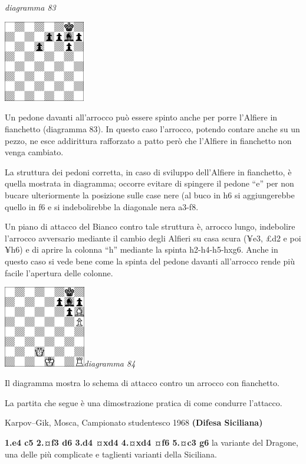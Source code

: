 \documentclass[
]{article}
\begin{document}
\emph{diagramma 83}

\includegraphics[width=1.39792in,height=1.39792in]{vertopal_109f12be458a423d8f3cc838880eaea2/media/image83.png}

Un pedone davanti all'arrocco può essere spinto anche per porre
l'Alfiere in fianchetto (diagramma 83). In questo caso l'arrocco,
potendo contare anche su un pezzo, ne esce addirittura rafforzato a
patto però che l'Alfiere in fianchetto non venga cambiato.

La struttura dei pedoni corretta, in caso di sviluppo dell'Alfiere in
fianchetto, è quella mostrata in diagramma; occorre evitare di spingere
il pedone ``e'' per non bucare ulteriormente la posizione sulle case
nere (al buco in h6 si aggiungerebbe quello in f6 e si indebolirebbe la
diagonale nera a3-f8.

Un piano di attacco del Bianco contro tale struttura è, arrocco lungo,
indebolire l'arrocco avversario mediante il cambio degli Alfieri su casa
scura (¥e3, £d2 e poi ¥h6) e di aprire la colonna ``h'' mediante la
spinta h2-h4-h5-hxg6. Anche in questo caso si vede bene come la spinta
del pedone davanti all'arrocco rende più facile l'apertura delle
colonne.

\includegraphics[width=1.40139in,height=1.40139in]{vertopal_109f12be458a423d8f3cc838880eaea2/media/image84.png}\emph{diagramma
84}

Il diagramma mostra lo schema di attacco contro un arrocco con
fianchetto.

La partita che segue è una dimostrazione pratica di come condurre
l'attacco.

Karpov--Gik, Mosca, Campionato studentesco 1968 \textbf{(Difesa
Siciliana)}

\textbf{1.e4 c5 2.¤f3 d6 3.d4 ¤xd4 4.¤xd4 ¤f6 5.¤c3 g6} la variante del
Dragone, una delle più complicate e taglienti varianti della Siciliana.
\end{document}
